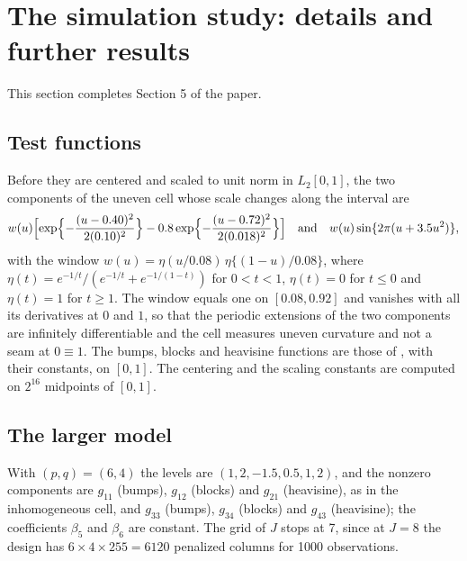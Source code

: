 \documentclass[10pt]{book}
\theoremstyle{definition}
\newcommand{\gcomp}[2]{g_{#1#2}}
\begin{document}
{\color{colR1}
\section{The simulation study: details and further results}
\label{sec:supp-sim}

This section completes Section 5 of the paper.

\subsection*{Test functions}

Before they are centered and scaled to unit norm in $L_2[0,1]$, the two
components of the uneven cell whose scale changes along the interval are
\[
  w(u)\Bigl[\exp\Bigl\{-\frac{(u-0.40)^{2}}{2(0.10)^{2}}\Bigr\}
  - 0.8\exp\Bigl\{-\frac{(u-0.72)^{2}}{2(0.018)^{2}}\Bigr\}\Bigr]
  \quad\text{and}\quad
  w(u)\sin\{2\pi(u + 3.5u^{2})\},
\]
with the window $w(u) = \eta(u/0.08)\,\eta\{(1-u)/0.08\}$, where
$\eta(t) = e^{-1/t}/(e^{-1/t} + e^{-1/(1-t)})$ for $0 < t < 1$,
$\eta(t) = 0$ for $t \le 0$ and $\eta(t) = 1$ for $t \ge 1$. The window equals
one on $[0.08, 0.92]$ and vanishes with all its derivatives at $0$ and $1$, so
that the periodic extensions of the two components are infinitely
differentiable and the cell measures uneven curvature and not a seam at
$0 \equiv 1$. The bumps, blocks and heavisine functions are those of
\citet{Donoho-Johnstone-1994}, with their constants, on $[0,1]$. The
centering and the scaling constants are computed on $2^{16}$ midpoints of
$[0,1]$.

\subsection*{The larger model}

With $(p,q) = (6,4)$ the levels are $(1, 2, -1.5, 0.5, 1, 2)$, and the
nonzero components are $\gcomp{1}{1}$ (bumps), $\gcomp{1}{2}$ (blocks) and
$\gcomp{2}{1}$ (heavisine), as in the inhomogeneous cell, and
$\gcomp{3}{3}$ (bumps), $\gcomp{3}{4}$ (blocks) and $\gcomp{4}{3}$
(heavisine); the coefficients $\beta_5$ and $\beta_6$ are constant. The grid
of $J$ stops at 7, since at $J = 8$ the design has $6 \times 4 \times 255 =
6120$ penalized columns for 1000 observations.

}
\end{document}
